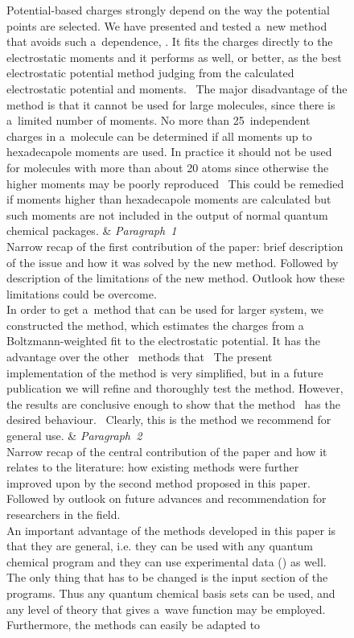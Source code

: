 \begin{figure}[p]
	\begin{tblr}{}
		Potential-based charges strongly depend on the way the potential points are selected. We have presented and tested a~new method that avoids such a~dependence, . It fits the charges directly to the electrostatic moments and it performs as well, or better, as the best electrostatic potential method judging from the calculated electrostatic potential and moments. \textellipsis\ The major disadvantage of the method is that it cannot be used for large molecules, since there is a~limited number of moments. No more than 25~independent charges in a~molecule can be determined if all moments up to hexadecapole moments are used. In practice it should not be used for molecules with more than about 20 atoms since otherwise the higher moments may be poorly reproduced \textellipsis\ This could be remedied if moments higher than hexadecapole moments are calculated but such moments are not included in the output of normal quantum chemical packages.
		&
		{%
			\textit{Paragraph~1} \\
			Narrow recap of the first contribution of the paper: brief description of the issue and how it was solved by the new method. Followed by description of the limitations of the new method. Outlook how these limitations could be overcome.
		}
		\\
		\hspace{\baselineskip}In order to get a~method that can be used for larger system, we constructed the  method, which estimates the charges from a Boltzmann-weighted fit to the electrostatic potential. It has the advantage over the other \textellipsis\ methods that \textellipsis\ The present implementation of the  method is very simplified, but in a future publication we will refine and thoroughly test the method. However, the results are conclusive enough to show that the method \textellipsis\ has the desired behaviour. \textellipsis\ Clearly, this is the method we recommend for general use.
		&
		{%
			\textit{Paragraph~2} \\
			Narrow recap of the central contribution of the paper and how it relates to the literature: how existing methods were further improved upon by the second method proposed in this paper. Followed by outlook on future advances and recommendation for researchers in the field.
		}
		\\
		\hspace{\baselineskip}An important advantage of the methods developed in this paper is that they are general, i.e. they can be used with any quantum chemical program and they can use experimental data (\textellipsis\!) as well. The only thing that has to be changed is the input section of the programs. Thus any quantum chemical basis sets can be used, and any level of theory that gives a~wave function may be employed. Furthermore, the methods can easily be adapted to \textellipsis

\end{tblr}
\end{figure}
